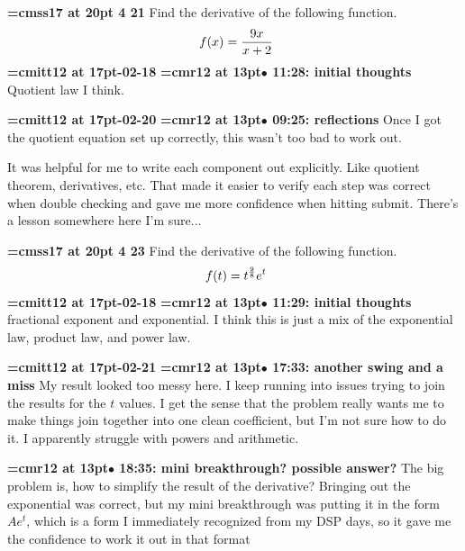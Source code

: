 {\medskip\noindent\bf\font\titlefont=cmss17 at 20pt 4 21}\medskip
Find the derivative of the following function.
$$\
f(x) = {9x \over x + 2}
$$
{\medskip\noindent\bf\font\titlefont=cmitt12 at 17pt-02-18}\medskip
{\smallskip\noindent\bf\font\titlefont=cmr12 at 13pt\titlefont $\bullet$ 11:28: initial thoughts}\smallskip
Quotient law I think.
\par

{\medskip\noindent\bf\font\titlefont=cmitt12 at 17pt-02-20}\medskip
{\smallskip\noindent\bf\font\titlefont=cmr12 at 13pt\titlefont $\bullet$ 09:25: reflections}\smallskip
Once I got the quotient equation set up correctly, this wasn't too bad to work out.
\par

It was helpful for me to write each component out explicitly. Like quotient theorem, derivatives, etc. That made it easier to verify each step was correct when double checking and gave me more confidence when hitting submit. There's a lesson somewhere here I'm sure...
\par

{\medskip\noindent\bf\font\titlefont=cmss17 at 20pt 4 23}\medskip
Find the derivative of the following function.
$$\
f(t) = t^{9\over 8} e^t
$$
{\medskip\noindent\bf\font\titlefont=cmitt12 at 17pt-02-18}\medskip
{\smallskip\noindent\bf\font\titlefont=cmr12 at 13pt\titlefont $\bullet$ 11:29: initial thoughts}\smallskip
fractional exponent and exponential. I think this is just a mix of the exponential law, product law, and power law.
\par

{\medskip\noindent\bf\font\titlefont=cmitt12 at 17pt-02-21}\medskip
{\smallskip\noindent\bf\font\titlefont=cmr12 at 13pt\titlefont $\bullet$ 17:33: another swing and a miss}\smallskip
My result looked too messy here. I keep running into issues trying to join the results for the $t$ values. I get the sense that the problem really wants me to make things join together into one clean coefficient, but I'm not sure how to do it. I apparently struggle with powers and arithmetic.
\par

{\smallskip\noindent\bf\font\titlefont=cmr12 at 13pt\titlefont $\bullet$ 18:35: mini breakthrough? possible answer?}\smallskip
The big problem is, how to simplify the result of the derivative? Bringing out the exponential was correct, but my mini breakthrough was putting it in the form $Ae^t$, which is a form I immediately recognized from my DSP days, so it gave me the confidence to work it out in that format
\par

